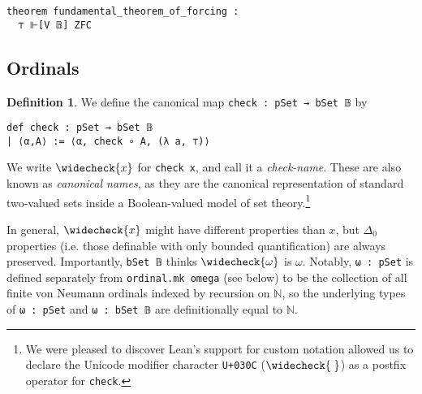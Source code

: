 \documentclass[sigplan,10pt,review, anonymous]{acmart}
\newcommand{\B}{\mathbb{B}}
\newcommand{\lil}{\lstinline}
\newcommand{\ZFC}{\mathsf{ZFC}}
\newtheorem{thm}{Theorem}[section]
\theoremstyle{definition}
\newtheorem{defn}{Definition}[section]
\begin{document}
\begin{lstlisting}
theorem fundamental_theorem_of_forcing :
  ⊤ ⊩[V 𝔹] ZFC
\end{lstlisting}


\subsection{Ordinals}
\begin{defn}\label{def:check}
  We define the canonical map \lil{check : pSet → bSet 𝔹} by
  \begin{lstlisting}
def check : pSet → bSet 𝔹
| ⟨α,A⟩ := ⟨α, check ∘ A, (λ a, ⊤)⟩
  \end{lstlisting}
  We write $\widecheck{x}$ for \lil{check x}, and call it a \emph{check-name}.
  These are also known as \emph{canonical names}, as they are the canonical representation of standard two-valued sets inside a Boolean-valued model of set theory.\footnote{We were pleased to discover Lean's support for custom notation allowed us to declare the Unicode modifier character \texttt{U+030C} ($\widecheck{\hspace{1mm}}$) as a postfix operator for \texttt{check}.}
\end{defn}

In general, $\widecheck{x}$ might have different properties than $x$, but \(\Delta_0\) properties (i.e. those definable with only bounded quantification) are always preserved. Importantly, \lil{bSet 𝔹} thinks $\widecheck{\omega}$ is $\omega$. Notably, \lil{ω : pSet} is defined separately from \lil{ordinal.mk omega} (see below) to be the collection of all finite von Neumann ordinals indexed by recursion on $\mathbb{N}$, so the underlying types of \lil{ω : pSet} and \lil{ω : bSet 𝔹} are definitionally equal to \(\mathbb{N}\).
\end{document}
